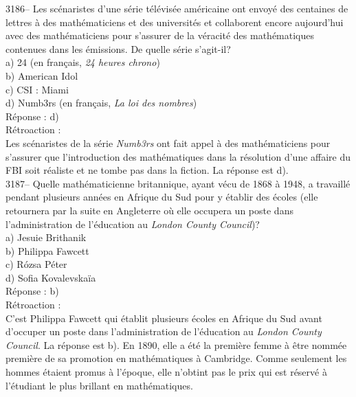 \documentclass[letterpaper, 12pt]{article}
\begin{document}
3186-- Les sc\'enaristes d'une s\'erie t\'el\'evis\'ee am\'ericaine ont envoy\'e des centaines de lettres \`a des math\'ematiciens et des universit\'es et collaborent encore aujourd'hui avec des math\'ematiciens pour s'assurer de la v\'eracit\'e des math\'ematiques contenues dans les \'emissions. De quelle s\'erie s'agit-il?\\

a) 24 (en fran\c cais, \emph{24 heures chrono})\\
b) American Idol\\
c) CSI : Miami\\
d) Numb3rs (en fran\c cais, \emph{La loi des nombres})\\

R\'eponse : d)\\

R\'etroaction :\\
Les sc\'enaristes de la s\'erie \emph{Numb3rs} ont fait appel \`a des math\'ematiciens pour s'assurer que l'introduction des math\'ematiques dans la r\'esolution d'une affaire du FBI soit r\'ealiste et ne tombe pas dans la fiction. La r\'eponse est d).\\



3187-- Quelle math\'ematicienne britannique, ayant v\'ecu de 1868 \`a 1948, a travaill\'e pendant plusieurs ann\'ees en Afrique du Sud pour y \'etablir des \'ecoles (elle retournera par la suite en Angleterre o\`u elle occupera un poste dans l'administration de l'\'education au \emph{London County Council})?\\

a) Jesuie Brithanik\\
b) Philippa Fawcett\\
c) R\'ozsa P\'eter\\
d) Sofia Kovalevska\"ia\\

R\'eponse : b)\\

R\'etroaction :\\
C'est Philippa Fawcett qui \'etablit plusieurs \'ecoles en Afrique du Sud avant d'occuper un poste dans l'administration de l'\'education au \emph{London County Council}. La r\'eponse est b). En 1890, elle a \'et\'e la premi\`ere femme \`a \^etre nomm\'ee premi\`ere de sa promotion en math\'ematiques \`a Cambridge. Comme seulement les hommes \'etaient promus \`a l'\'epoque, elle n'obtint pas le prix qui est r\'eserv\'e \`a l'\'etudiant le plus brillant en math\'ematiques.\\
\end{document}
